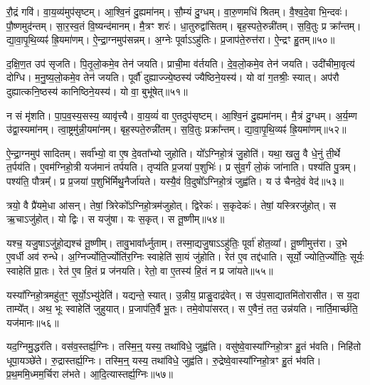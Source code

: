 रौ॒द्रं गवि॑।
वा॒य॒व्य॑मुप॑सृष्टम्।
आ॒श्वि॒नं दु॒ह्यमा॑नम्।
सौ॒म्यं दु॒ग्धम्।
वा॒रु॒णमधि॑ श्रितम्।
वै॒श्व॒दे॒वा भि॒न्दवः॑।
पौ॒ष्णमुद॑न्तम्।
सा॒र॒स्व॒तं वि॒ष्यन्द॑मानम्।
मै॒त्रꣳ शरः॑।
धा॒तुरुद्वा॑सितम्।
बृह॒स्पते॒रुन्नी॑तम्।
स॒वि॒तुः प्र क्रा᳚न्तम्।
द्या॒वा॒पृ॒थि॒व्यꣴ॑ ह्रि॒यमा॑णम्।
ऐ॒न्द्रा॒ग्नमुप॑सन्नम्।
अ॒ग्नेः पूर्वा\-ऽऽहु॑तिः।
प्र॒जा\-प॑ते॒रुत्त॑रा।
ऐ॒न्द्रꣳ हु॒तम्॥५०॥\ip\anuvakamend[उद्वा॑सितꣳ स॒प्त च॑]

द॒क्षि॒ण॒त उप॑ \-सृजति।
पि॒तृ॒लो॒कमे॒व तेन॑ जयति।
प्राची॒मा व॑र्तयति।
दे॒व॒लो॒कमे॒व तेन॑ जयति।
उदी॑चीमा॒वृत्य॑ दोग्धि।
म॒नु॒ष्य॒लो॒कमे॒व तेन॑ जयति।
पूर्वौ॑ दुह्याज्ज्ये॒ष्ठस्य॑ ज्यैष्ठिने॒यस्य॑।
यो वा॑ ग॒तश्रीः॒ स्यात्।
अप॑रौ दुह्यात्कनि॒ष्ठस्य॑ कानिष्ठिने॒यस्य॑।
यो वा॒ बुभू॑षेत्॥५१॥\ip

न सं मृ॑शति।
पा॒प॒व॒स्य॒सस्य॒ व्यावृ॑त्त्यै।
वा॒य॒व्यं॑ वा ए॒तदुप॑सृष्टम्।
आ॒श्वि॒नं दु॒ह्यमा॑नम्।
मै॒त्रं दु॒ग्धम्।
अ॒र्य॒म्ण उ॑द्वा॒स्यमा॑नम्।
त्वा॒ष्ट्रमु॑न्नी॒यमा॑नम्।
बृह॒स्पते॒रुन्नी॑तम्।
स॒वि॒तुः प्रक्रा᳚न्तम्।
द्या॒वा॒पृ॒थि॒व्यꣴ॑ ह्रि॒यमा॑णम्॥५२॥\ip

ऐ॒न्द्रा॒ग्नमुप॑ सादितम्।
सर्वा᳚भ्यो॒ वा ए॒ष दे॒वता᳚भ्यो जुहोति।
यो᳚ऽग्निहो॒त्रं जु॒होति॑।
यथा॒ खलु॒ वै धे॒नुं ती॒र्थे त॒र्पय॑ति।
ए॒वम॑ग्निहो॒त्री यज॑मानं तर्पयति।
तृप्य॑ति प्र॒जया॑ प॒शुभिः॑।
प्र सु॑व॒र्गं लो॒कं जा॑नाति।
पश्य॑ति पु॒त्रम्।
पश्य॑ति॒ पौत्रम्᳚।
प्र प्र॒जया॑ प॒शुभि॑र्मिथु॒नैर्जा॑यते।
यस्यै॒वं वि॒दुषो᳚\-ऽग्निहो॒त्रं जुह्व॑ति।
य उ॑ चैनदे॒वं वेद॑॥५३॥\ip\anuvakamend[बुभू॑षेद्ध्रि॒यमा॑णञ्जायते॒ द्वे च॑]

त्रयो॒ वै प्रै॑यमे॒धा आ॑सन्।
तेषां॒ त्रिरेको᳚\-ऽग्निहो॒त्रम॑जुहोत्।
द्विरेकः॑।
स॒कृदेकः॑।
तेषां॒ यस्त्रिरजु॑होत्।
स ऋ॒चा\-ऽजु॑होत्।
यो द्विः।
स यजु॑षा।
यः स॒कृत्।
स तू॒ष्णीम्॥५४॥\ip

यश्च॒ यजु॒षा\-ऽजु॑हो॒द्यश्च॑ तू॒ष्णीम्।
तावु॒भावा᳚र्ध्नुताम्।
तस्मा॒द्यजु॒षा\-ऽऽहु॑तिः॒ पूर्वा॑ होत॒व्या᳚।
तू॒ष्णीमुत्त॑रा।
उ॒भे ए॒वर्धी अव॑ रुन्धे।
अ॒ग्निर्ज्योति॒र्ज्योति॑र॒ग्निः स्वाहेति॑ सा॒यं जु॑होति।
रेत॑ ए॒व तद्द॑धाति।
सूर्यो॒ ज्योति॒र्ज्योतिः॒ सूर्यः॒ स्वाहेति॑ प्रा॒तः।
रेत॑ ए॒व हि॒तं प्र ज॑नयति।
रेतो॒ वा ए॒तस्य॑ हि॒तं न प्र जा॑यते॥५५॥\ip

यस्या᳚ग्निहो॒त्रमहु॑त॒ꣳ॒ सूर्यो॒\-ऽभ्यु॑देति॑।
यद्यन्ते॒ स्यात्।
उ॒न्नीय॒ प्राङु॒दाद्र॑वेत्।
स उ॑प॒साद्यातमि॑तोरासीत।
स य॒दा ताम्ये᳚त्।
अथ॒ भूः स्वाहेति॑ जुहुयात्।
प्र॒जा\-प॑ति॒र्वै भू॒तः।
तमे॒वोपा॑सरत्।
स ए॒वैनं॒ तत॒ उन्न॑यति।
नार्ति॒मार्च्छ॑ति॒ यज॑मानः॥५६॥\ip\anuvakamend[तू॒ष्णीं जा॑यते॒ यज॑मानः]

यद॒ग्निमु॒द्धर॑ति।
वस॑व॒स्तर्ह्य॒ग्निः।
तस्मि॒न्॒ यस्य॒ तथा॑विधे॒ जुह्व॑ति।
वसु॑ष्वे॒वास्या᳚ग्निहो॒त्रꣳ हु॒तं भ॑वति।
निहि॑तो धूपा॒यञ्छे॑ते।
रु॒द्रास्तर्ह्य॒ग्निः।
तस्मि॒न्॒ यस्य॒ तथा॑विधे॒ जुह्व॑ति।
रु॒द्रेष्वे॒वास्या᳚ग्निहो॒त्रꣳ हु॒तं भ॑वति।
प्र॒थ॒ममि॒ध्मम॒र्चिरा ल॑भते।
आ॒दि॒त्यास्तर्ह्य॒ग्निः॥५७॥\ip

